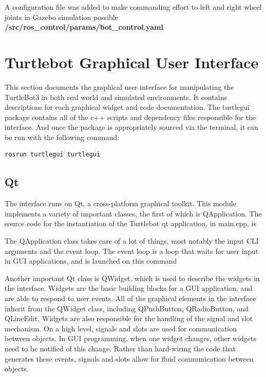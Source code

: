 \documentclass[12]{article}
\begin{document}
A configuration file was added to make commanding effort to left and right wheel joints in Gazebo simulation possible\\
\textbf{/src/ros\_control/params/bot\_control.yaml} \\

\section{Turtlebot Graphical User Interface}
This section documents the graphical user interface for manipulating the TurtleBot3 in both real world and simulated environments. It contains descriptions for each graphical widget and code documentation. The turtlegui package contains all of the c++ scripts and dependency files responsible for the interface. And once the package is appropriately sourced via the terminal, it can be run with the following command:\\

\begin{lstlisting}[style=bash]
rosrun turtlegui turtlegui
\end{lstlisting}
\subsection{Qt}
The interface runs on Qt, a cross-platform graphical toolkit. 
This module implements a variety of important classes, the first of which is QApplication. 
The source code for the instantiation of the Turtlebot qt application, in main.cpp, is


The QApplication class takes care of a lot of things, most notably the input CLI arguments and the event loop. The event loop is a loop that waits for user input in GUI applications, and is launched on this command


Another important Qt class is QWidget, which is used to describe the widgets in the interface. Widgets are the basic building blocks for a GUI application, and are able to respond to user events. All of the graphical elements in the interface inherit from the QWidget class, including QPushButton, QRadioButton, and QLineEdit. Widgets are also responsible for the handling of the signal and slot mechanism. On a high level, signals and slots are used for communication between objects. In GUI programming, when one widget changes, other widgets need to be notified of this change. Rather than hard-wiring the code that generates these events, signals and slots allow for fluid communication between objects.\\ 
\end{document}
